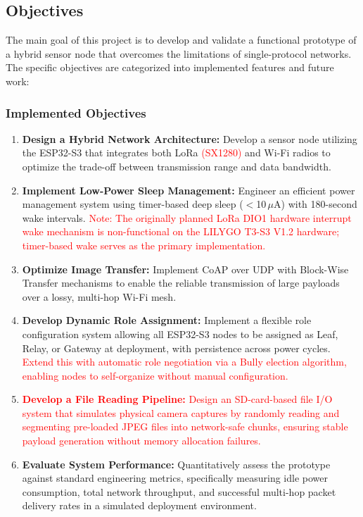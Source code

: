 \documentclass[12pt,a4paper]{article}
\DeclareRobustCommand{\changed}[1]{\textcolor{red}{#1}}
\begin{document}
\subsection{Objectives}

The main goal of this project is to develop and validate a functional prototype of a hybrid sensor node that overcomes the limitations of single-protocol networks. The specific objectives are categorized into implemented features and future work:

\subsubsection{Implemented Objectives}

\begin{enumerate}
    \item \textbf{Design a Hybrid Network Architecture:} Develop a sensor node utilizing the ESP32-S3 that integrates both LoRa \changed{(SX1280)} and Wi-Fi radios to optimize the trade-off between transmission range and data bandwidth.

    \item \textbf{Implement Low-Power Sleep Management:} Engineer an efficient power management system using timer-based deep sleep ($<$10\,$\mu$A) with 180-second wake intervals. \changed{Note: The originally planned LoRa DIO1 hardware interrupt wake mechanism is non-functional on the LILYGO T3-S3 V1.2 hardware; timer-based wake serves as the primary implementation.}

    \item \textbf{Optimize Image Transfer:} Implement CoAP over UDP with Block-Wise Transfer mechanisms to enable the reliable transmission of large payloads over a lossy, multi-hop Wi-Fi mesh.

    \item \textbf{Develop Dynamic Role Assignment:} Implement a flexible role configuration system allowing all ESP32-S3 nodes to be assigned as Leaf, Relay, or Gateway at deployment, with persistence across power cycles. \changed{Extend this with automatic role negotiation via a Bully election algorithm, enabling nodes to self-organize without manual configuration.}

    \item \changed{\textbf{Develop a File Reading Pipeline:} Design an SD-card-based file I/O system that simulates physical camera captures by randomly reading and segmenting pre-loaded JPEG files into network-safe chunks, ensuring stable payload generation without memory allocation failures.}

    \item \textbf{Evaluate System Performance:} Quantitatively assess the prototype against standard engineering metrics, specifically measuring idle power consumption, total network throughput, and successful multi-hop packet delivery rates in a simulated deployment environment.
\end{enumerate}
\end{document}

